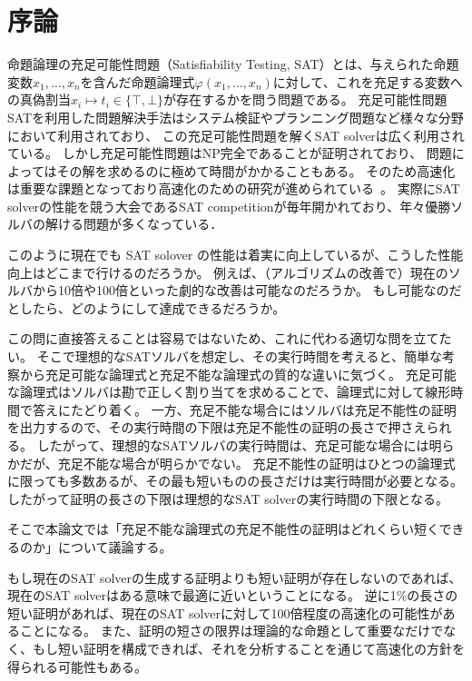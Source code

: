 \section{序論}
命題論理の充足可能性問題（Satisfiability Testing, SAT）とは、与えられた命題変数\( x_1,\dots,x_n \)を含んだ命題論理式\( \varphi(x_1,\dots,x_n) \)に対して、これを充足する変数への真偽割当\( x_i \mapsto t_i \in \{ \top, \bot \} \)が存在するかを問う問題である。
充足可能性問題SATを利用した問題解決手法はシステム検証やプランニング問題など様々な分野において利用されており、
この充足可能性問題を解くSAT solverは広く利用されている\cite{PracticalExample}。
しかし充足可能性問題はNP完全であることが証明されており\cite{Cook}、
問題によってはその解を求めるのに極めて時間がかかることもある。
そのため高速化は重要な課題となっており高速化のための研究が進められている~\cite{glucose,Chaff,BerkMin,MINISAT,kissat,neuralnet-vs-random-VSIDS}。
実際にSAT solverの性能を競う大会であるSAT competitionが毎年開かれており、年々優勝ソルバの解ける問題が多くなっている．

このように現在でも SAT solover の性能は着実に向上しているが、こうした性能向上はどこまで行けるのだろうか。
例えば、（アルゴリズムの改善で）現在のソルバから10倍や100倍といった劇的な改善は可能なのだろうか。
もし可能なのだとしたら、どのようにして達成できるだろうか。

この問に直接答えることは容易ではないため、これに代わる適切な問を立てたい。
そこで理想的なSATソルバを想定し、その実行時間を考えると、簡単な考察から充足可能な論理式と充足不能な論理式の質的な違いに気づく。
充足可能な論理式はソルバは勘で正しく割り当てを求めることで、論理式に対して線形時間で答えにたどり着く。
一方、充足不能な場合にはソルバは充足不能性の証明を出力するので、その実行時間の下限は充足不能性の証明の長さで押さえられる。
したがって、理想的なSATソルバの実行時間は、充足可能な場合には明らかだが、充足不能な場合が明らかでない。
充足不能性の証明はひとつの論理式に限っても多数あるが、その最も短いものの長さだけは実行時間が必要となる。
したがって証明の長さの下限は理想的なSAT solverの実行時間の下限となる。 

そこで本論文では「充足不能な論理式の充足不能性の証明はどれくらい短くできるのか」について議論する。
\begin{comment}
    さらに、短い証明を作ることは、ソルバの性能の限界に関する間接的な答えを与えることができる。
    SAT solverは充足不能な命題に対して充足不能性の証明を与えるため、
\end{comment}
もし現在のSAT solverの生成する証明よりも短い証明が存在しないのであれば、
現在のSAT solverはある意味で最適に近いということになる。
逆に1\%の長さの短い証明があれば、現在のSAT solverに対して100倍程度の高速化の可能性があることになる。
また、証明の短さの限界は理論的な命題として重要なだけでなく、もし短い証明を構成できれば、それを分析することを通じて高速化の方針を得られる可能性もある。

